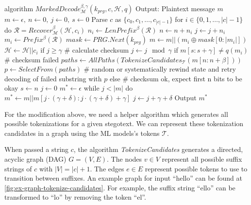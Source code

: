 \begin{Pseudocode}[float, caption={
Marked Decode Algorithm.
In comparison to the original algorithm \autoref{alg:decode}, MarkedDecode checks the checksum every $\gamma$ bits. 
If the checksum does not match, a decoding error happened.
We then perform a lookbehind on the stegotext and generate all possible tokenizations $paths$ for a substring of $c$.
Afterwards, rewind the internal state retry decoding with a path $p$ selected from $paths$.
}, label={alg:marked-decode}]
algorithm $MarkedDecode_{\mathcal{M}}^{\beta,\gamma}(k_{prg}, c, \mathcal{H}, q)$
	Output: Plaintext message $m$
	$m \leftarrow \epsilon,~ n \leftarrow 0,~ j \leftarrow 0,~ s \leftarrow 0$
	Parse $c$ as $\{ c_0, c_1, \dots, c_{|c|-1} \}$
	for $i \in \{0, 1, \dots, |c|-1 \}$ do
		$\mathcal{R} = Recover_{\mathcal{M}}^\beta(\mathcal{H}, c_i)$
		$n_i \leftarrow LenPrefix^\beta(\mathcal{R})$
		$n \leftarrow n + n_i$
		$j \leftarrow j + n_i$
		$m_i \leftarrow Prefix^\beta(\mathcal{R})$
		$mask \leftarrow PRG.Next(k_{prg})$
		$m \leftarrow m || (m_i \oplus mask[0: |m_i|])$
		$\mathcal{H} \leftarrow \mathcal{H}||c_i$
		if $j \geq \gamma$
			# calculate checksum
			$j \leftarrow j \mod \gamma$
			if $m[s:s+\gamma] \neq q(m_i)$  # checksum failed
				$paths \leftarrow AllPaths(TokenizeCandidates_{\mathcal{T}}(m[n:n+\beta]))$
				$p \leftarrow SelectFrom(paths)$  # random or systematically
				rewind state and retry decoding of failed substring with $p$
			else  # checksum ok, expect first n bits to be okay
				$s \leftarrow n$
	$j \leftarrow 0$
	$m^* \leftarrow \epsilon$
	while $j < |m|$ do
		$m^* \leftarrow m || m[j \cdot (\gamma+\delta): j \cdot (\gamma+\delta) + \gamma]$
		$j \leftarrow j + \gamma+\delta$
	Output $m^*$
\end{Pseudocode}

For the modification above, we need a helper algorithm which generates all possible tokenizations for a given stegotext.
We can represent these tokenization candidates in a graph using the ML models's tokens $\mathcal{T}$.

When passed a string $c$, the algorithm \emph{TokenizeCandidates} generates a directed, acyclic graph (DAG) $G = (V, E)$.
The nodes $v \in V$ represent all possible suffix strings of $c$ with $|V| = |c| + 1$.
The edges $e \in E$ represent possible tokens to use to transition between suffixes.
An example graph for input ``hello'' can be found at \ref{fig:ex-graph-tokenize-candidates}.
For example, the suffix string ``ello'' can be transformed to ``lo'' by removing the token ``el''.

